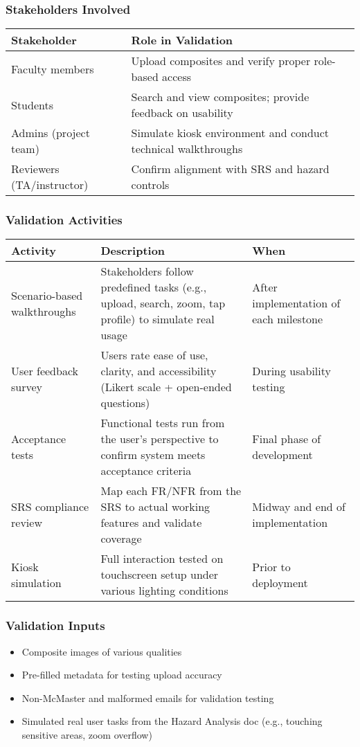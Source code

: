 \documentclass[12pt, titlepage]{article}
\begin{document}
\subsubsection*{Stakeholders Involved}

\begin{longtable}{|p{4cm}|p{10cm}|}
\hline
\textbf{Stakeholder} & \textbf{Role in Validation} \\
\hline
Faculty members & Upload composites and verify proper role-based access \\
\hline
Students & Search and view composites; provide feedback on usability \\
\hline
Admins (project team) & Simulate kiosk environment and conduct technical walkthroughs \\
\hline
Reviewers (TA/instructor) & Confirm alignment with SRS and hazard controls \\
\hline
\end{longtable}

\subsubsection*{Validation Activities}

\begin{longtable}{|p{4cm}|p{8cm}|p{4cm}|}
\hline
\textbf{Activity} & \textbf{Description} & \textbf{When} \\
\hline
Scenario-based walkthroughs & Stakeholders follow predefined tasks (e.g., upload, search, zoom, tap profile) to simulate real usage & After implementation of each milestone \\
\hline
User feedback survey & Users rate ease of use, clarity, and accessibility (Likert scale + open-ended questions) & During usability testing \\
\hline
Acceptance tests & Functional tests run from the user's perspective to confirm system meets acceptance criteria & Final phase of development \\
\hline
SRS compliance review & Map each FR/NFR from the SRS to actual working features and validate coverage & Midway and end of implementation \\
\hline
Kiosk simulation & Full interaction tested on touchscreen setup under various lighting conditions & Prior to deployment \\
\hline
\end{longtable}

\subsubsection*{Validation Inputs}
\begin{itemize}
    \item Composite images of various qualities
    \item Pre-filled metadata for testing upload accuracy
    \item Non-McMaster and malformed emails for validation testing
    \item Simulated real user tasks from the Hazard Analysis doc (e.g., touching sensitive areas, zoom overflow)
\end{itemize}
\end{document}
